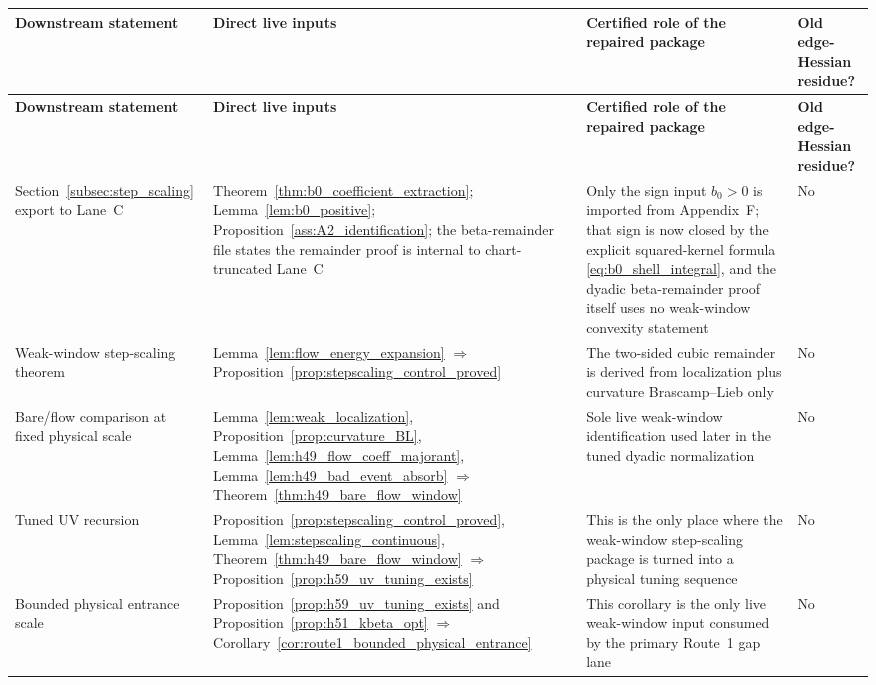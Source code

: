 \begingroup
\small
\setlength{\tabcolsep}{4pt}
\begin{longtable}{@{}
>{\RaggedRight\arraybackslash}p{}
>{\RaggedRight\arraybackslash}p{}
>{\RaggedRight\arraybackslash}p{}
>{\RaggedRight\arraybackslash}p{}@{}}
\toprule
\textbf{Downstream statement} & \textbf{Direct live inputs} & \textbf{Certified role of the repaired package} & \textbf{Old edge-Hessian residue?}\\
\midrule
\endfirsthead
\toprule
\textbf{Downstream statement} & \textbf{Direct live inputs} & \textbf{Certified role of the repaired package} & \textbf{Old edge-Hessian residue?}\\
\midrule
\endhead
Section~\ref{subsec:step_scaling} export to Lane~C & Theorem~\ref{thm:b0_coefficient_extraction}; Lemma~\ref{lem:b0_positive}; Proposition~\ref{ass:A2_identification}; the beta-remainder file states the remainder proof is internal to chart-truncated Lane~C & Only the sign input $b_0>0$ is imported from Appendix~F; that sign is now closed by the explicit squared-kernel formula \eqref{eq:b0_shell_integral}, and the dyadic beta-remainder proof itself uses no weak-window convexity statement & No\\[0.35em]

Weak-window step-scaling theorem & Lemma~\ref{lem:flow_energy_expansion} $\Rightarrow$ Proposition~\ref{prop:stepscaling_control_proved} & The two-sided cubic remainder is derived from localization plus curvature Brascamp--Lieb only & No\\[0.35em]

Bare/flow comparison at fixed physical scale & Lemma~\ref{lem:weak_localization}, Proposition~\ref{prop:curvature_BL}, Lemma~\ref{lem:h49_flow_coeff_majorant}, Lemma~\ref{lem:h49_bad_event_absorb} $\Rightarrow$ Theorem~\ref{thm:h49_bare_flow_window} & Sole live weak-window identification used later in the tuned dyadic normalization & No\\[0.35em]

Tuned UV recursion & Proposition~\ref{prop:stepscaling_control_proved}, Lemma~\ref{lem:stepscaling_continuous}, Theorem~\ref{thm:h49_bare_flow_window} $\Rightarrow$ Proposition~\ref{prop:h59_uv_tuning_exists} & This is the only place where the weak-window step-scaling package is turned into a physical tuning sequence & No\\[0.35em]

Bounded physical entrance scale & Proposition~\ref{prop:h59_uv_tuning_exists} and Proposition~\ref{prop:h51_kbeta_opt} $\Rightarrow$ Corollary~\ref{cor:route1_bounded_physical_entrance} & This corollary is the only live weak-window input consumed by the primary Route~1 gap lane & No\\[0.35em]


\end{longtable}
